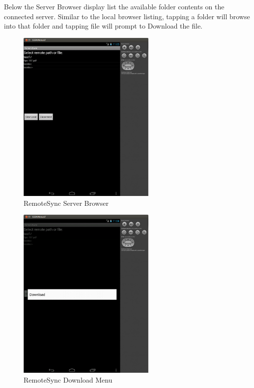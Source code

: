 \documentclass[12pt]{article}
\begin{document}
Below the Server Browser display list the available folder contents on the connected server. Similar to the local browser listing, tapping a folder will browse into that folder and tapping file will prompt to Download the file.

\begin{figure}[H]
\center
\includegraphics[width=0.6\textwidth]{remote-browser-view.png}
\caption{RemoteSync Server Browser}
\end{figure}

\begin{figure}[H]
\center
\includegraphics[width=0.6\textwidth]{download-context-menu.png}
\caption{RemoteSync Download Menu}
\end{figure}
\end{document}

